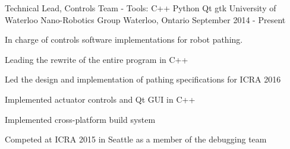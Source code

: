 \begin{cventries}

\cventry
    {Technical Lead, Controls Team - Tools: C++ \textbullet{} Python \textbullet{} Qt \textbullet{} gtk}
    {University of Waterloo Nano-Robotics Group}
    {Waterloo, Ontario}
{September 2014 - Present} %
{ %
In charge of controls software implementations for robot pathing.
\begin{cvitems}
\item[]
\item {Leading the rewrite of the entire program in C++}
\item {Led the design and implementation of pathing specifications for ICRA 2016}
\item {Implemented actuator controls and Qt GUI in C++}
\item {Implemented cross-platform build system}
\item {Competed at ICRA 2015 in Seattle as a member of the debugging team}
\end{cvitems} 
}


\end{cventries}
